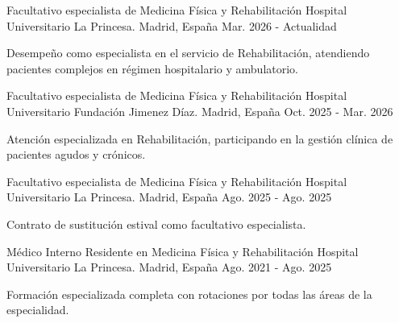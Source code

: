 

\begin{cventries}

  \cventry
    {Facultativo especialista de Medicina Física y Rehabilitación} %
    {Hospital Universitario La Princesa.} %
    {Madrid, España} %
    {Mar. 2026 - Actualidad} %
    {
      \begin{cvitems} %
        \item {Desempeño como especialista en el servicio de Rehabilitación, atendiendo pacientes complejos en régimen hospitalario y ambulatorio.}
      \end{cvitems}
    }

  \cventry
    {Facultativo especialista de Medicina Física y Rehabilitación} %
    {Hospital Universitario Fundación Jimenez Díaz.} %
    {Madrid, España} %
    {Oct. 2025 - Mar. 2026} %
    {
      \begin{cvitems} %
        \item {Atención especializada en Rehabilitación, participando en la gestión clínica de pacientes agudos y crónicos.}
      \end{cvitems}
    }

  \cventry
    {Facultativo especialista de Medicina Física y Rehabilitación} %
    {Hospital Universitario La Princesa.} %
    {Madrid, España} %
    {Ago. 2025 - Ago. 2025} %
    {
      \begin{cvitems} %
        \item {Contrato de sustitución estival como facultativo especialista.}
      \end{cvitems}
    }

  \cventry
    {Médico Interno Residente en Medicina Física y Rehabilitación} %
    {Hospital Universitario La Princesa.} %
    {Madrid, España} %
    {Ago. 2021 - Ago. 2025} %
    {
      \begin{cvitems} %
        \item {Formación especializada completa con rotaciones por todas las áreas de la especialidad.}
      \end{cvitems}
    }


\end{cventries}
